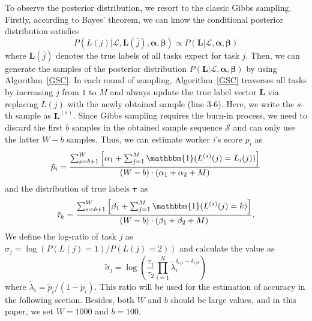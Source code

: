\documentclass{article}
\begin{document}
To observe the posterior distribution, we resort to the classic Gibbs sampling. Firstly, according to Bayes' theorem, we can know the conditional posterior distribution satisfies
\begin{equation}
P(L(j)|\mathcal{L}, \bm{L}(\bar{j}), \bm{\alpha}, \bm{\beta})\propto P(\bm{L}|\mathcal{L}, \bm{\alpha}, \bm{\beta})
\end{equation} 
where $\bm{L}(\bar{j})$ denotes the true labels of all tasks expect for task $j$.
Then, we can generate the samples of the posterior distribution $P(\bm{L}|\mathcal{L}, \bm{\alpha}, \bm{\beta})$ by using Algorithm~\ref{GSC}.
In each round of sampling, Algorithm~\ref{GSC} traverses all tasks by increasing $j$ from $1$ to $M$ and always update the true label vector $\bm{L}$ via replacing $L(j)$ with the newly obtained sample (line 3-6).
Here, we write the $s$-th sample as $\bm{L}^{(s)}$.
Since Gibbs sampling requires the burn-in process, we need to discard the first $b$ samples in the obtained sample sequence $\mathcal{S}$ and can only use the latter $W-b$ samples.
Thus, we can estimate worker $i$'s score $p_i$ as
\begin{equation}
\label{p_infer}
\tilde{p}_{i}=\frac{\sum_{s=b+1}^{W}\left[\alpha_{1}+\sum_{j=1}^{M}\mathbbm{1}(L^{(s)}(j)=L_{i}(j))\right]}{(W-b)\cdot(\alpha_{1}+\alpha_{2}+M)}
\end{equation}
and the distribution of true labels $\bm{\tau}$ as
\begin{equation}
\label{tau_infer}
\tilde{\tau}_{k}=\frac{\sum_{s=b+1}^{W}\left[\beta_{1}+\sum_{j=1}^{M}\mathbbm{1}(L^{(s)}(j)=k)\right]}{(W-b)\cdot(\beta_{1}+\beta_{2}+M)}.
\end{equation}
We define the log-ratio of task $j$ as $\sigma_j =\log (P(L(j)=1)/P(L(j)=2))$ and calculate the value as
\begin{equation}
\label{ProbRatio}
\tilde{\sigma}_j=\log\left(\frac{\tau_1}{\tau_2}{\prod}_{i=1}^{N}\tilde{\lambda}_i^{\delta_{ij1}-\delta_{ij2}}\right)
\end{equation}
where $\tilde{\lambda}_i = \tilde{p}_i/(1-\tilde{p}_i)$. This ratio will be used for the estimation of accuracy in the following section.
Besides, both $W$ and $b$ should be large values, and in this paper, we set $W=1000$ and $b=100$.
\end{document}
